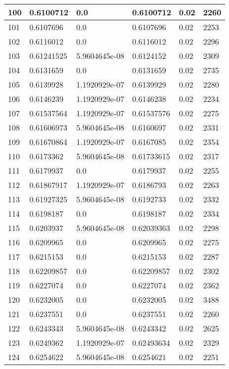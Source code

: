 \begin{longtable}{|l|l|l|l|l|l|}
100 & 0.6100712 & 0.0 & 0.6100712 & 0.02 & 2260 \\ \hline 
101 & 0.6107696 & 0.0 & 0.6107696 & 0.02 & 2253 \\ \hline 
102 & 0.6116012 & 0.0 & 0.6116012 & 0.02 & 2296 \\ \hline 
103 & 0.61241525 & 5.9604645e-08 & 0.6124152 & 0.02 & 2309 \\ \hline 
104 & 0.6131659 & 0.0 & 0.6131659 & 0.02 & 2735 \\ \hline 
105 & 0.6139928 & 1.1920929e-07 & 0.6139929 & 0.02 & 2280 \\ \hline 
106 & 0.6146239 & 1.1920929e-07 & 0.6146238 & 0.02 & 2234 \\ \hline 
107 & 0.61537564 & 1.1920929e-07 & 0.61537576 & 0.02 & 2275 \\ \hline 
108 & 0.61606973 & 5.9604645e-08 & 0.6160697 & 0.02 & 2331 \\ \hline 
109 & 0.61670864 & 1.1920929e-07 & 0.6167085 & 0.02 & 2354 \\ \hline 
110 & 0.6173362 & 5.9604645e-08 & 0.61733615 & 0.02 & 2317 \\ \hline 
111 & 0.6179937 & 0.0 & 0.6179937 & 0.02 & 2255 \\ \hline 
112 & 0.61867917 & 1.1920929e-07 & 0.6186793 & 0.02 & 2263 \\ \hline 
113 & 0.61927325 & 5.9604645e-08 & 0.6192733 & 0.02 & 2332 \\ \hline 
114 & 0.6198187 & 0.0 & 0.6198187 & 0.02 & 2334 \\ \hline 
115 & 0.6203937 & 5.9604645e-08 & 0.62039363 & 0.02 & 2298 \\ \hline 
116 & 0.6209965 & 0.0 & 0.6209965 & 0.02 & 2275 \\ \hline 
117 & 0.6215153 & 0.0 & 0.6215153 & 0.02 & 2287 \\ \hline 
118 & 0.62209857 & 0.0 & 0.62209857 & 0.02 & 2302 \\ \hline 
119 & 0.6227074 & 0.0 & 0.6227074 & 0.02 & 2362 \\ \hline 
120 & 0.6232005 & 0.0 & 0.6232005 & 0.02 & 3488 \\ \hline 
121 & 0.6237551 & 0.0 & 0.6237551 & 0.02 & 2260 \\ \hline 
122 & 0.6243343 & 5.9604645e-08 & 0.6243342 & 0.02 & 2625 \\ \hline 
123 & 0.6249362 & 1.1920929e-07 & 0.62493634 & 0.02 & 2329 \\ \hline 
124 & 0.6254622 & 5.9604645e-08 & 0.6254621 & 0.02 & 2251 \\ \hline 

\end{longtable}
